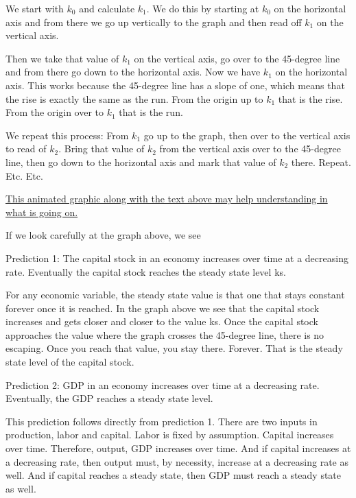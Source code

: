 \documentclass[
]{book}
\begin{document}
We start with \(k_0\) and calculate \(k_1\). We do this by starting at \(k_0\) on the horizontal axis and from there we go up vertically to the graph and then read off \(k_1\) on the vertical axis.

Then we take that value of \(k_1\) on the vertical axis, go over to the 45-degree line and from there go down to the horizontal axis. Now we have \(k_1\) on the horizontal axis. This works because the 45-degree line has a slope of one, which means that the rise is exactly the same as the run. From the origin up to \(k_1\) that is the rise. From the origin over to \(k_1\) that is the run.

We repeat this process: From \(k_1\) go up to the graph, then over to the vertical axis to read of \(k_2\). Bring that value of \(k_2\) from the vertical axis over to the 45-degree line, then go down to the horizontal axis and mark that value of \(k_2\) there.
Repeat.
Etc.
Etc.

\href{https://i.imgur.com/IZTZUav.gif}{This animated graphic along with the text above may help understanding in what is going on.}

If we look carefully at the graph above, we see

Prediction 1: The capital stock in an economy increases over time at a decreasing rate. Eventually the capital stock reaches the steady state level ks.

For any economic variable, the steady state value is that one that stays constant forever once it is reached.
In the graph above we see that the capital stock increases and gets closer and closer to the value ks. Once the capital stock approaches the value where the graph crosses the 45-degree line, there is no escaping. Once you reach that value, you stay there. Forever. That is the steady state level of the capital stock.

Prediction 2: GDP in an economy increases over time at a decreasing rate. Eventually, the GDP reaches a steady state level.

This prediction follows directly from prediction 1. There are two inputs in production, labor and capital. Labor is fixed by assumption. Capital increases over time. Therefore, output, GDP increases over time. And if capital increases at a decreasing rate, then output must, by necessity, increase at a decreasing rate as well. And if capital reaches a steady state, then GDP must reach a steady state as well.
\end{document}
